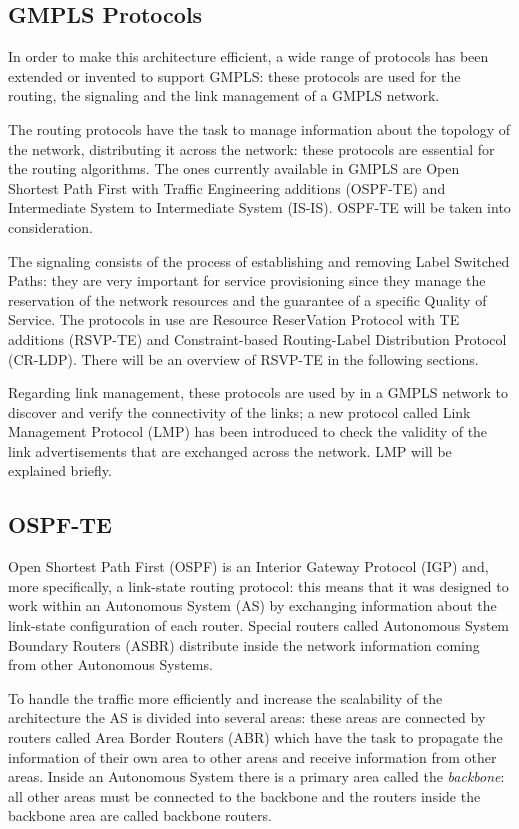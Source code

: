 \documentclass[10pt,a4paper]{report}
\begin{document}
\subsection{GMPLS Protocols}

In order to make this architecture efficient, a wide range of
protocols has been extended or invented to support GMPLS: these
protocols are used for the routing, the signaling and the link
management of a GMPLS network.

The routing protocols have the task to manage information about the
topology of the network, distributing it across the network: these
protocols are essential for the routing algorithms. The ones currently
available in GMPLS are Open Shortest Path First with Traffic
Engineering additions (OSPF-TE) and Intermediate System to
Intermediate System (IS-IS). OSPF-TE will be taken into consideration.

The signaling consists of the process of establishing and removing
Label Switched Paths: they are very important for service provisioning
since they manage the reservation of the network resources and the
guarantee of a specific Quality of Service. The protocols in use are
Resource ReserVation Protocol with TE additions (RSVP-TE) and
Constraint-based Routing-Label Distribution Protocol (CR-LDP). There
will be an overview of RSVP-TE in the following sections.

Regarding link management, these protocols are used by in a GMPLS
network to discover and verify the connectivity of the links; a new
protocol called Link Management Protocol (LMP) has been introduced to
check the validity of the link advertisements that are exchanged
across the network. LMP will be explained briefly.

\subsection{OSPF-TE}

Open Shortest Path First (OSPF) is an Interior Gateway Protocol (IGP)
and, more specifically, a link-state routing protocol: this means that
it was designed to work within an Autonomous System (AS) by exchanging
information about the link-state configuration of each router. Special
routers called Autonomous System Boundary Routers (ASBR) distribute
inside the network information coming from other Autonomous Systems. 

To handle the traffic more efficiently and increase the scalability of
the architecture the AS is divided into several areas: these areas are
connected by routers called Area Border Routers (ABR) which have the
task to propagate the information of their own area to other areas and
receive information from other areas. Inside an Autonomous System
there is a primary area called the \textit{backbone}: all other areas
must be connected to the backbone and the routers inside the backbone
area are called backbone routers.
\end{document}
